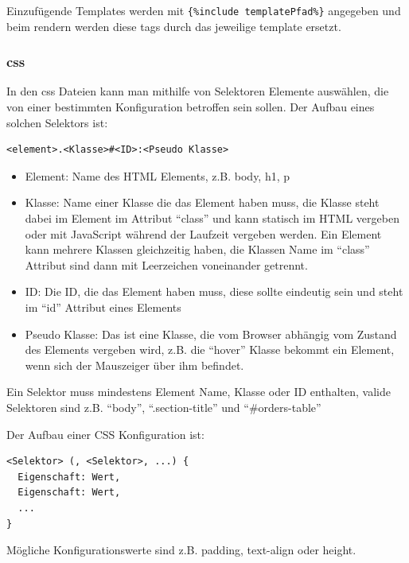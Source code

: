 \documentclass[12pt,pdftex,parskip=half]{scrartcl}
\begin{document}
                Einzufügende Templates werden mit \lstinline|{%include templatePfad%}| angegeben und beim rendern werden diese tags durch das jeweilige template ersetzt.


        \newpage


        \subsubsection{css}

        In den css Dateien kann man mithilfe von Selektoren Elemente auswählen, die von einer bestimmten Konfiguration betroffen sein sollen.
        Der Aufbau eines solchen Selektors ist:


        \begin{lstlisting}
<element>.<Klasse>#<ID>:<Pseudo Klasse>
        \end{lstlisting}

        \begin{itemize}
            \item Element: Name des HTML Elements, z.B. body, h1, p
            \item Klasse: Name einer Klasse die das Element haben muss, die Klasse steht dabei im Element im Attribut ``class'' und kann statisch im HTML vergeben oder mit JavaScript während der Laufzeit vergeben werden. Ein Element kann mehrere Klassen gleichzeitig haben, die Klassen Name im ``class'' Attribut sind dann mit Leerzeichen voneinander getrennt.
            \item ID: Die ID, die das Element haben muss, diese sollte eindeutig sein und steht im ``id'' Attribut eines Elements
            \item Pseudo Klasse: Das ist eine Klasse, die vom Browser abhängig vom Zustand des Elements vergeben wird, z.B. die "`hover"' Klasse bekommt ein Element, wenn sich der Mauszeiger über ihm befindet.
        \end{itemize}


        Ein Selektor muss mindestens Element Name, Klasse oder ID enthalten, valide Selektoren sind z.B. "`body"', "`.section-title"' und "`\#orders-table"'

        Der Aufbau einer CSS Konfiguration ist:

        \begin{lstlisting}
<Selektor> (, <Selektor>, ...) {
  Eigenschaft: Wert,
  Eigenschaft: Wert,
  ...
}
        \end{lstlisting}


        Mögliche Konfigurationswerte sind z.B. padding, text-align oder height.
\end{document}
